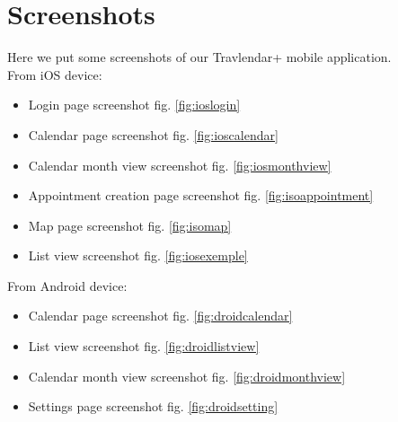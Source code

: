 \chapter{Screenshots}
\label{cha:screen}
Here we put some screenshots of our Travlendar+ mobile application.\\
From iOS device:
\begin{itemize}
\item Login page screenshot fig. \ref{fig:ioslogin}
\item Calendar page screenshot fig. \ref{fig:ioscalendar}
\item Calendar month view screenshot fig. \ref{fig:iosmonthview}
\item Appointment creation page screenshot fig. \ref{fig:isoappointment}
\item Map page screenshot fig. \ref{fig:isomap}
\item List view screenshot fig. \ref{fig:iosexemple}
\end{itemize}

From Android device:
\begin{itemize}
\item Calendar page screenshot fig. \ref{fig:droidcalendar}
\item List view screenshot fig. \ref{fig:droidlistview}
\item Calendar month view screenshot fig. \ref{fig:droidmonthview}
\item Settings page screenshot fig. \ref{fig:droidsetting}
\end{itemize}


